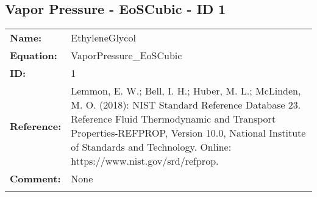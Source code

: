 \FloatBarrier
\newpage
\subsection{Vapor Pressure - EoSCubic - ID 1}
%
\begin{tabular}[l]{|lp{11.5cm}|}
\hline
\addlinespace

\textbf{Name:} & EthyleneGlycol \\
\textbf{Equation:} & VaporPressure\_EoSCubic \\
\textbf{ID:} & 1 \\
\textbf{Reference:} & Lemmon, E. W.; Bell, I. H.; Huber, M. L.; McLinden, M. O. (2018): NIST Standard Reference Database 23. Reference Fluid Thermodynamic and Transport Properties-REFPROP, Version 10.0, National Institute of Standards and Technology. Online: https://www.nist.gov/srd/refprop. \\
\textbf{Comment:} & None \\

\addlinespace
\hline
\end{tabular}
\newline

